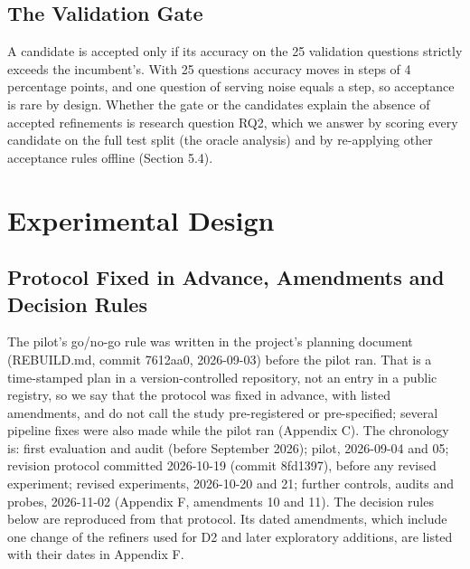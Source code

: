 \documentclass{ieeeaccess}
\begin{document}
\subsection{The Validation Gate}

A candidate is accepted only if its accuracy on the 25 validation questions strictly exceeds the incumbent's. With 25 questions accuracy moves in steps of 4 percentage points, and one question of serving noise equals a step, so acceptance is rare by design. Whether the gate or the candidates explain the absence of accepted refinements is research question RQ2, which we answer by scoring every candidate on the full test split (the oracle analysis) and by re-applying other acceptance rules offline (Section 5.4).

\section{Experimental Design}

\subsection{Protocol Fixed in Advance, Amendments and Decision Rules}

The pilot's go/no-go rule was written in the project's planning document (REBUILD.md, commit 7612aa0, 2026-09-03) before the pilot ran. That is a time-stamped plan in a version-controlled repository, not an entry in a public registry, so we say that the protocol was fixed in advance, with listed amendments, and do not call the study pre-registered or pre-specified; several pipeline fixes were also made while the pilot ran (Appendix C). The chronology is: first evaluation and audit (before September 2026); pilot, 2026-09-04 and 05; revision protocol committed 2026-10-19 (commit 8fd1397), before any revised experiment; revised experiments, 2026-10-20 and 21; further controls, audits and probes, 2026-11-02 (Appendix F, amendments 10 and 11). The decision rules below are reproduced from that protocol. Its dated amendments, which include one change of the refiners used for D2 and later exploratory additions, are listed with their dates in Appendix F.
\end{document}
